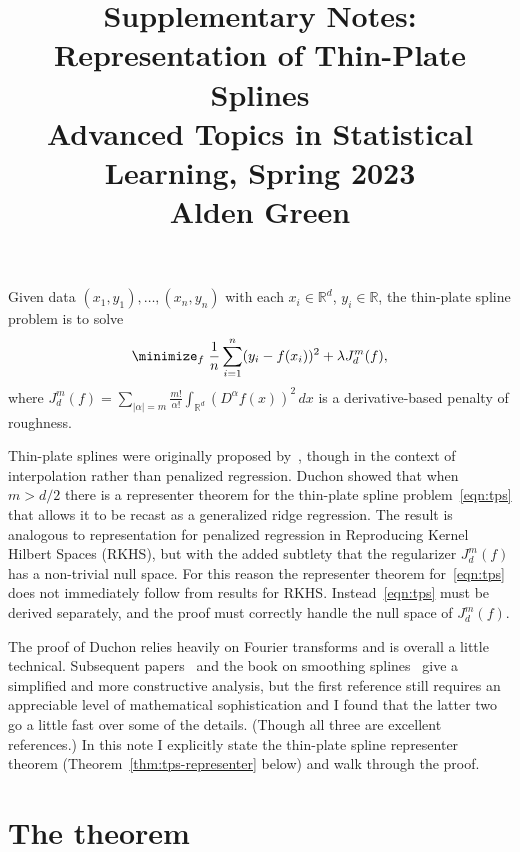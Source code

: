 \documentclass{article}
\title{Supplementary Notes: Representation of Thin-Plate Splines \\ \smallskip
\large Advanced Topics in Statistical Learning, Spring 2023 \\ \smallskip
Alden Green}
\author{}
\date{}
\newcommand{\Reals}{\mathbb{R}} %
\newcommand{\Rd}{\Reals^d}
\newcommand{\1}{\mathbf{1}}
\begin{document}
\maketitle
\RaggedRight
\vspace{-50pt}

Given data $(x_1,y_1),\ldots,(x_n,y_n)$ with each $x_i \in \Reals^{d}$, $y_i \in \Reals$, the thin-plate spline problem is to solve
\begin{equation}
\label{eqn:tps}
\minimize_f \; \frac{1}{n}\sum_{i = 1}^{n}(y_i - f(x_i))^2 + \lambda J_d^{m}(f),
\end{equation}
where $J_d^{m}(f) = \sum_{|\alpha| = m} \frac{m!}{\alpha!} \int_{\Rd} (D^{\alpha}f(x))^2 \,dx$ is a derivative-based penalty of roughness.

Thin-plate splines were originally proposed by~\citet{duchon1977splines}, though in the context of interpolation rather than penalized regression. Duchon showed that when $m > d/2$ there is a representer theorem for the thin-plate spline problem~\eqref{eqn:tps} that allows it to be recast as a generalized ridge regression. The result is analogous to representation for penalized regression in Reproducing Kernel Hilbert Spaces (RKHS), but with the added subtlety that the regularizer $J_d^m(f)$ has a non-trivial null space. For this reason the representer theorem for~\eqref{eqn:tps} does not immediately follow from results for RKHS. Instead~\eqref{eqn:tps} must be derived separately, and the proof must correctly handle the null space of $J_d^m(f)$.

The proof of Duchon relies heavily on Fourier transforms and is overall a little technical. Subsequent papers~\citet{meinguet1979multivariate,wahba1980some} and the book on smoothing splines~\citet{gu2013smoothing} give a simplified and more constructive analysis, but the first reference still requires an appreciable level of mathematical sophistication and I found that the latter two go a little fast over some of the details. (Though all three are excellent references.) In this note I explicitly state the thin-plate spline representer theorem (Theorem~\ref{thm:tps-representer} below) and walk through the proof.

\section{The theorem}
\end{document}
